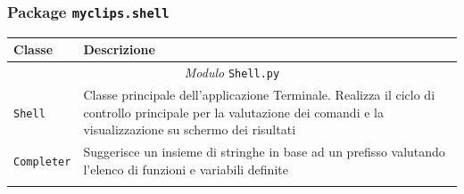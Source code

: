 \subsubsection{Package \texttt{myclips.shell}}

\begin{longtable}{p{5.5cm}p{6.5cm}}
\hline 
\textbf{Classe} & \textbf{Descrizione} \\ 
\hline\hline 
\endhead

\multicolumn{2}{c}{\emph{Modulo} \texttt{Shell.py}}\\
	\hdashline[5pt/5pt]
		\texttt{Shell} & Classe principale dell'applicazione Terminale. Realizza il ciclo di controllo principale per la valutazione dei comandi e la visualizzazione su schermo dei risultati \\ 
	\hdashline[5pt/5pt]
		\texttt{Completer} & Suggerisce un insieme di stringhe in base ad un prefisso valutando l'elenco di funzioni e variabili definite \\ 
	\hline\\

\end{longtable}

